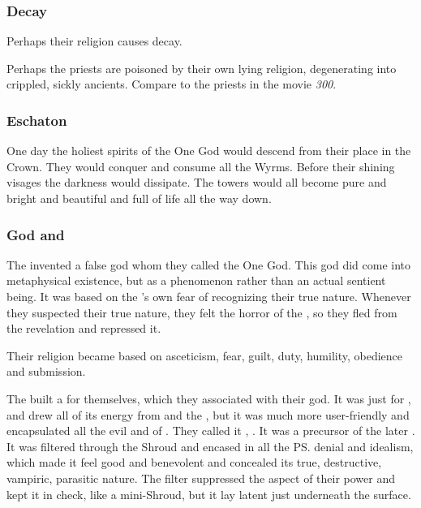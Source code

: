 \subsubsection{Decay}
Perhaps their religion causes decay. 


Perhaps the \Merkyran{} priests are poisoned by their own lying religion, degenerating into crippled, sickly ancients. 
Compare to the priests in the movie \emph{300}. 





\subsubsection{Eschaton}
One day the holiest spirits of the One God would descend from their place in the Crown.
They would conquer and consume all the Wyrms.
Before their shining visages the darkness would dissipate.
The towers would all become pure and bright and beautiful and full of life all the way down.





\subsubsection{God and \Esheram}
The \Merkyrans invented a false god whom they called the One God. 
This god did come into metaphysical existence, but as a phenomenon rather than an actual sentient being. 
It was based on the \resphain's own fear of recognizing their true nature. 
Whenever they suspected their true nature, they felt the horror of the \banes, so they fled from the revelation and repressed it. 

Their religion became based on asceticism, fear, guilt, duty, humility, obedience and submission. 

The \Merkyrans built a \dweomer for themselves, which they associated with their god. 
It was just  for \itzach, and drew all of its energy from \Nyx{} and the \banelords, but it was much more user-friendly and encapsulated all the evil and  of \itzach. 
They called it \Esheram, . 
It was a precursor of the later \iquin.
It was filtered through the Shroud and encased in all the \ps{\resphain}{} denial and idealism, which made it feel good and benevolent and concealed its true, destructive, vampiric, parasitic nature. 
The \Merkyran filter suppressed the \Nyxian{} aspect of their power and kept it in check, like a mini-Shroud, but it lay latent just underneath the surface. 

